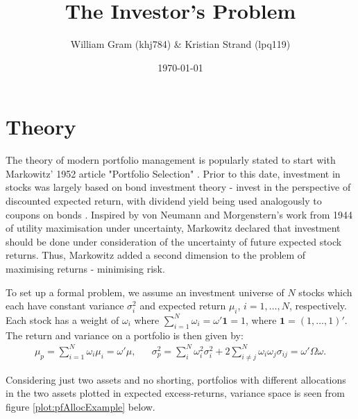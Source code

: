 \documentclass[11pt,a4paper,oneside]{article}
\title{The Investor's Problem}
\author{William Gram (khj784) \& Kristian Strand (lpq119)}
\date{\today}
\newcommand{\lp}{\left(}
\newcommand{\rp}{\right)}
\begin{document}
\maketitle

\newpage

\rfoot{\thepage}

\tableofcontents

\newpage

\setcounter{page}{1}

\section{Theory}
The theory of modern portfolio management is popularly stated to start with Markowitz' 1952 article "Portfolio Selection" \cite{MPT52}. Prior to this date, investment in stocks was largely based on bond investment theory - invest in the perspective of discounted expected return, with dividend yield being used analogously to coupons on bonds \cite{guerard2016}. Inspired by von Neumann and Morgenstern's work from 1944 \cite{vnm1944} of utility maximisation under uncertainty, Markowitz declared that investment should be done under consideration of the uncertainty of future expected stock returns. Thus, Markowitz added a second dimension to the problem of maximising returns - minimising risk.

To set up a formal problem, we assume an investment universe of $N$ stocks which each have constant variance $\sigma_i^2$ and expected return $\mu_i$, $i = 1, \dots, N$, respectively. Each stock has a weight of $\omega_i$ where $\sum_{i = 1}^N \omega_i = \omega'\mathbf{1} = 1$, where $\mathbf{1} = \lp 1, \dots, 1\rp'$. The return and variance on a portfolio is then given by:
\begin{align*}
    \mu_p = \sum_{i=1}^N \omega_i \mu_i = \omega'\mu, &&
    \sigma_p^2 = \sum_{i}^N \omega_i^2 \sigma_i^2 + 2 \sum_{i\neq j}^N \omega_i\omega_j \sigma_{ij} = \omega'\Omega \omega.
\end{align*}

Considering just two assets and no shorting, portfolios with different allocations in the two assets plotted in expected excess-returns, variance space is seen from figure \ref{plot:pfAllocExample} below.
\end{document}

